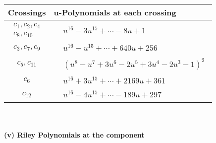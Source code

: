 \documentclass[1p]{elsarticle_modified}
\theoremstyle{definition}
\begin{document}
\begin{tabular}{m{50pt}|m{274pt}}
Crossings & \hspace{64pt}u-Polynomials at each crossing \\
\hline $$\begin{aligned}c_{1},c_{2},c_{4}\\c_{8},c_{10}\end{aligned}$$&$\begin{aligned}
&u^{16}-3 u^{15}+\cdots-8 u+1
\end{aligned}$\\
\hline $$\begin{aligned}c_{3},c_{7},c_{9}\end{aligned}$$&$\begin{aligned}
&u^{16}- u^{15}+\cdots+640 u+256
\end{aligned}$\\
\hline $$\begin{aligned}c_{5},c_{11}\end{aligned}$$&$\begin{aligned}
&(u^8- u^7+3 u^6-2 u^5+3 u^4-2 u^3-1)^2
\end{aligned}$\\
\hline $$\begin{aligned}c_{6}\end{aligned}$$&$\begin{aligned}
&u^{16}+3 u^{15}+\cdots+2169 u+361
\end{aligned}$\\
\hline $$\begin{aligned}c_{12}\end{aligned}$$&$\begin{aligned}
&u^{16}-4 u^{15}+\cdots-189 u+297
\end{aligned}$\\
\hline
\end{tabular}\\~\\
\newpage\renewcommand{\arraystretch}{1}
\flushleft \textbf{(v) Riley Polynomials at the component}\newline \\
\end{document}
